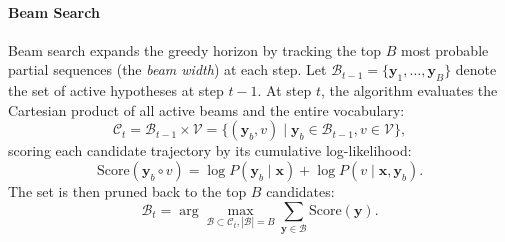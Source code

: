 \documentclass[../../../main.tex]{subfiles}
\begin{document}
\paragraph{Beam Search}
Beam search expands the greedy horizon by tracking the top $B$ most probable partial sequences (the \emph{beam width}) at each step. Let $\mathcal{B}_{t-1} = \{\mathbf{y}_1, \dots, \mathbf{y}_B\}$ denote the set of active hypotheses at step $t-1$. At step $t$, the algorithm evaluates the Cartesian product of all active beams and the entire vocabulary:
\begin{equation}
\mathcal{C}_t = \mathcal{B}_{t-1} \times \mathcal{V} = \{(\mathbf{y}_b, v) \mid \mathbf{y}_b \in \mathcal{B}_{t-1}, v \in \mathcal{V}\},
\label{eq:beam_candidate_set}
\end{equation}
scoring each candidate trajectory by its cumulative log-likelihood:
\begin{equation}
\text{Score}(\mathbf{y}_b \circ v) = \log P(\mathbf{y}_b \mid \mathbf{x}) + \log P(v \mid \mathbf{x}, \mathbf{y}_b).
\label{eq:beam_search_log_score}
\end{equation}
The set is then pruned back to the top $B$ candidates:
\begin{equation}
\mathcal{B}_t = \arg\max_{\mathcal{B} \subset \mathcal{C}_t, |\mathcal{B}|=B} \sum_{\mathbf{y} \in \mathcal{B}} \text{Score}(\mathbf{y}).
\label{eq:beam_search_prune}
\end{equation}
\end{document}
